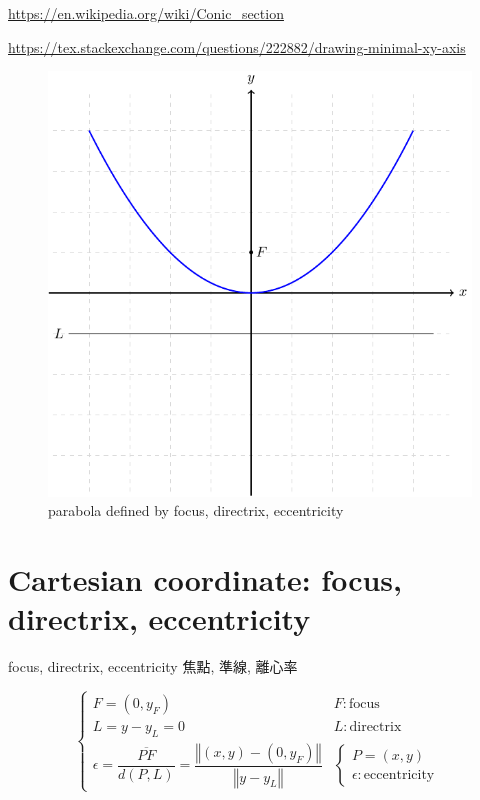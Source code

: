 \documentclass[
]{book}
\theoremstyle{definition}
\theoremstyle{definition}
\theoremstyle{definition}
\theoremstyle{definition}
\theoremstyle{remark}
\begin{document}
\url{https://en.wikipedia.org/wiki/Conic_section}

\url{https://tex.stackexchange.com/questions/222882/drawing-minimal-xy-axis}

\begin{figure}
\includegraphics[width=0.75\linewidth]{202402252333-conic-section_files/figure-latex/unnamed-chunk-1-1} \caption{parabola defined by focus, directrix, eccentricity}\label{fig:unnamed-chunk-1}
\end{figure}

\hypertarget{cartesian-coordinate-focus-directrix-eccentricity}{%
\section{Cartesian coordinate: focus, directrix, eccentricity}\label{cartesian-coordinate-focus-directrix-eccentricity}}

\begin{CJK}{UTF8}{bsmi}
focus, directrix, eccentricity 焦點, 準線, 離心率
\end{CJK}

\[
\begin{cases}
F=\left(0,y_{{\scriptscriptstyle F}}\right) & F:\text{focus}\\
L=y-y_{{\scriptscriptstyle L}}=0 & L:\text{directrix}\\
\epsilon=\dfrac{\overline{PF}}{d\left(P,L\right)}=\dfrac{\left\Vert \left(x,y\right)-\left(0,y_{{\scriptscriptstyle F}}\right)\right\Vert }{\left\Vert y-y_{{\scriptscriptstyle L}}\right\Vert } & \begin{cases}
P=\left(x,y\right)\\
\epsilon:\text{eccentricity}
\end{cases}
\end{cases}
\]
\end{document}

